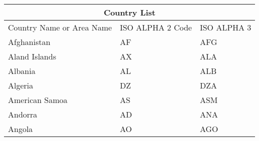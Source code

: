 \documentclass{article}
\begin{document}
\begin{tabularx}{\textwidth}{|X|X|X|} 
\hline
\multicolumn{3}{|c|}{Country List} \\ \hline
Country Name or Area Name & ISO ALPHA 2 Code & ISO ALPHA 3 \\ \hline
Afghanistan & AF & AFG \\
Aland Islands & AX & ALA \\
Albania & AL & ALB \\
Algeria & DZ & DZA \\
American Samoa & AS & ASM \\
Andorra & AD & ANA \\
Angola & AO & AGO \\
\hline
\end{tabularx}
\end{document}
